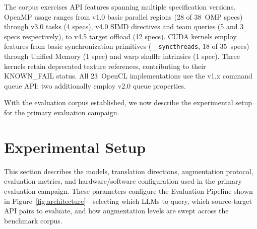 \documentclass{article}
\begin{document}
The corpus exercises API features spanning multiple specification versions. OpenMP usage ranges from v1.0 basic parallel regions (28 of 38~OMP specs) through v3.0 tasks (4 specs), v4.0 SIMD directives and team queries (5 and 3 specs respectively), to v4.5 target offload (12 specs). CUDA kernels employ features from basic synchronization primitives (\texttt{\_\_syncthreads}, 18 of 35~specs) through Unified Memory (1 spec) and warp shuffle intrinsics (1 spec). Three kernels retain deprecated texture references, contributing to their KNOWN\_FAIL status. All 23~OpenCL implementations use the v1.x command queue API; two additionally employ v2.0 queue properties.

With the evaluation corpus established, we now describe the experimental setup for the primary evaluation campaign.



\section{Experimental Setup}
\label{sec:experimental-setup}

This section describes the models, translation directions, augmentation protocol, evaluation metrics, and hardware/software configuration used in the primary evaluation campaign. These parameters configure the Evaluation Pipeline shown in Figure~\ref{fig:architecture}---selecting which LLMs to query, which source-target API pairs to evaluate, and how augmentation levels are swept across the benchmark corpus.
\end{document}
